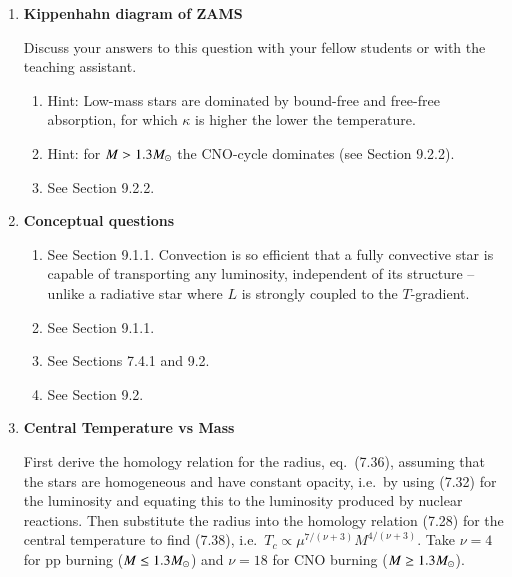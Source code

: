 \documentclass[11pt,a4paper,fleqn]{report}
\begin{document}

\begin{enumerate}
  
\item {\bf Kippenhahn diagram of ZAMS}

  Discuss your answers to this question with your fellow students or
  with the teaching assistant.

  \begin{enumerate}

  \item Hint: Low-mass stars are dominated by bound-free and free-free
    absorption, for which $\kappa$ is higher the lower the
    temperature.

  \item Hint: for $M > 1.3 {M}_\odot$ the CNO-cycle dominates (see Section
    9.2.2).

  \item See Section 9.2.2.

  \end{enumerate}


\item {\bf Conceptual questions}

  \begin{enumerate}
	
  \item See Section 9.1.1.  Convection is so efficient that a fully
    convective star is capable of transporting any luminosity,
    independent of its structure -- unlike a radiative star where $L$
    is strongly coupled to the $T$-gradient.
    
  \item See Section 9.1.1.

  \item See Sections 7.4.1 and 9.2.

  \item See Section 9.2.

  \end{enumerate} 


\item { \bf Central Temperature vs Mass}

  First derive the homology relation for the radius, eq.~(7.36),
  assuming that the stars are homogeneous and have constant opacity,
  i.e.\ by using (7.32) for the luminosity and equating this to the
  luminosity produced by nuclear reactions. Then substitute the radius
  into the homology relation (7.28) for the central temperature to
  find (7.38), i.e.\ $T_c \propto \mu^{7/(\nu +3)} M^{4/(\nu +3)}$.
  Take $\nu = 4$ for pp burning ($M \leq 1.3 {M}_\odot$) and $\nu = 18$
  for CNO burning ($M \geq 1.3 {M}_\odot$).


\end{enumerate}
\end{document}
